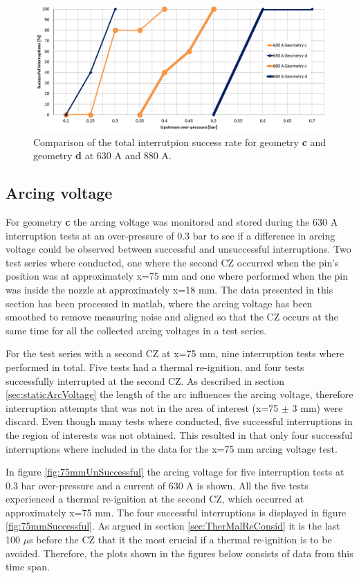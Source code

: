 \documentclass[10pt,b5paper,twoside]{article}
\begin{document}
\begin{figure}[H]
\centering
\includegraphics[scale=0.5, angle =90 ]{Bilder/Results/compAllCylin.png}
\caption{Comparison of the total interrutpion success rate for geometry \textbf{c} and geometry \textbf{d} at 630 A and 880 A.} \label{fig:compgeoCandDAllcurrents}
\end{figure}

\newpage
\subsection{Arcing voltage}
For geometry \textbf{c} the arcing voltage was monitored and stored during the 630 A interruption tests at an over-pressure of 0.3 bar to see if a difference in arcing voltage could be observed between successful and unsuccessful interruptions. Two test series where conducted, one where the second CZ occurred when the pin's position was at approximately x=75 mm and one where performed when the pin was inside the nozzle at approximately x=18 mm. The data presented in this section has been processed in matlab, where the arcing voltage has been smoothed to remove measuring noise and aligned so that the CZ occurs at the same time for all the collected arcing voltages in a test series. 

For the test series with a second CZ at x=75 mm, nine interruption tests where performed in total. Five tests had a thermal re-ignition, and four tests successfully interrupted at the second CZ. As described in section \ref{sec:staticArcVoltage} the length of the arc influences the arcing voltage, therefore interruption attempts that was not in the area of interest (x=75 $\pm$ 3 mm) were discard. Even though many tests where conducted, five successful interruptions in the region of interests was not obtained. This resulted in that only four successful interruptions where included in the data for the x=75 mm arcing voltage test.

In figure \ref{fig:75mmUnSuccessful} the arcing voltage for five interruption tests at 0.3 bar over-pressure and a current of 630 A is shown. All the five tests experienced a thermal re-ignition at the second CZ, which occurred at approximately  x=75 mm. The four successful interruptions is displayed in figure \ref{fig:75mmSuccessful}. As argued in section \ref{sec:TherMalReConsid} it is the last 100 $\mu$s before the CZ that it the most crucial if a thermal re-ignition is to be avoided. Therefore, the plots shown in the figures below consists of data from this time span. 
\end{document}
